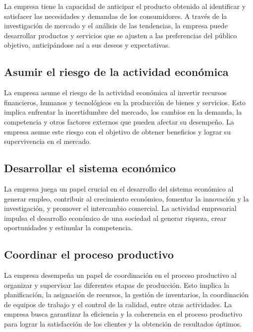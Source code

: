 \documentclass[
  a4paper,
]{article}
\begin{document}
La empresa tiene la capacidad de anticipar el producto obtenido al
identificar y satisfacer las necesidades y demandas de los consumidores.
A través de la investigación de mercado y el análisis de las tendencias,
la empresa puede desarrollar productos y servicios que se ajusten a las
preferencias del público objetivo, anticipándose así a sus deseos y
expectativas.

\hypertarget{asumir-el-riesgo-de-la-actividad-econuxf3mica}{%
\subsection{Asumir el riesgo de la actividad
económica}\label{asumir-el-riesgo-de-la-actividad-econuxf3mica}}

La empresa asume el riesgo de la actividad económica al invertir
recursos financieros, humanos y tecnológicos en la producción de bienes
y servicios. Esto implica enfrentar la incertidumbre del mercado, los
cambios en la demanda, la competencia y otros factores externos que
pueden afectar su desempeño. La empresa asume este riesgo con el
objetivo de obtener beneficios y lograr su supervivencia en el mercado.

\hypertarget{desarrollar-el-sistema-econuxf3mico}{%
\subsection{Desarrollar el sistema
económico}\label{desarrollar-el-sistema-econuxf3mico}}

La empresa juega un papel crucial en el desarrollo del sistema económico
al generar empleo, contribuir al crecimiento económico, fomentar la
innovación y la investigación, y promover el intercambio comercial. La
actividad empresarial impulsa el desarrollo económico de una sociedad al
generar riqueza, crear oportunidades y estimular la competencia.

\hypertarget{coordinar-el-proceso-productivo}{%
\subsection{Coordinar el proceso
productivo}\label{coordinar-el-proceso-productivo}}

La empresa desempeña un papel de coordinación en el proceso productivo
al organizar y supervisar las diferentes etapas de producción. Esto
implica la planificación, la asignación de recursos, la gestión de
inventarios, la coordinación de equipos de trabajo y el control de la
calidad, entre otras actividades. La empresa busca garantizar la
eficiencia y la coherencia en el proceso productivo para lograr la
satisfacción de los clientes y la obtención de resultados óptimos.
\end{document}
